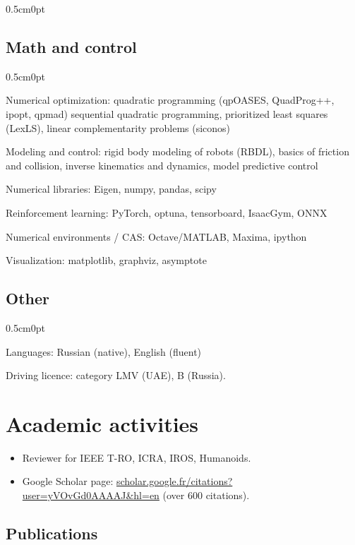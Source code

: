 \documentclass[a4paper,10pt]{report}
\newcommand{\cvurl}[2]{\href{#1://#2}{\url{#2}}}
\newenvironment{cvindent}{\begin{adjustwidth}{0.5cm}{0pt}}{\end{adjustwidth}}
\newenvironment{cvdescription}[1][]{\begin{cvindent}\begin{description}[#1]}{\end{description}\end{cvindent}}
\begin{document}
\begin{cvindent}
\subsection{Math and control}
\begin{cvdescription}
    \item[Numerical optimization:] quadratic programming (qpOASES,
        QuadProg++, ipopt, qpmad) sequential quadratic programming,
        prioritized least squares (LexLS), linear complementarity problems
        (siconos)
    \item[Modeling and control:] rigid body modeling of robots (RBDL),
        basics of friction and collision, inverse kinematics and dynamics,
        model predictive control
    \item[Numerical libraries:]          Eigen, numpy, pandas, scipy
    \item[Reinforcement learning:]       PyTorch, optuna, tensorboard, IsaacGym, ONNX
    \item[Numerical environments / CAS:] Octave/MATLAB, Maxima, ipython
    \item[Visualization:]                matplotlib, graphviz, asymptote
\end{cvdescription}


\subsection{Other}
\begin{cvdescription}
    \item[Languages:] Russian (native), English (fluent)
    \item[Driving licence:] category LMV (UAE), B (Russia).
\end{cvdescription}
\end{cvindent}


\vspace{0.15cm}
\section{Academic activities}
\begin{itemize}
    \item Reviewer for IEEE T-RO, ICRA, IROS, Humanoids.
    \item Google Scholar page: \cvurl{https}{scholar.google.fr/citations?user=yVOvGd0AAAAJ&hl=en} (over 600 citations).
\end{itemize}

\subsection{\hspace{0.5cm}Publications}
    \nocite{*}
    \printbibliography[heading=none]
\end{document}
